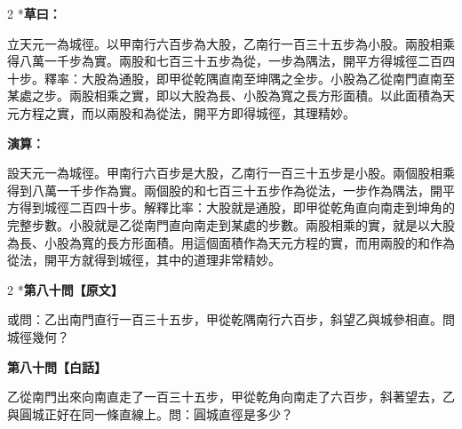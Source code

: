 \documentclass[11pt,a4paper]{article}
\begin{document}
\begin{paracol}{2}
\switchcolumn[0]*\textbf{草曰：}

\small 立天元一為城徑。以甲南行六百步為大股，乙南行一百三十五步為小股。兩股相乘得八萬一千步為實。兩股和七百三十五步為從，一步為隅法，開平方得城徑二百四十步。釋率：大股為通股，即甲從乾隅直南至坤隅之全步。小股為乙從南門直南至某處之步。兩股相乘之實，即以大股為長、小股為寬之長方形面積。以此面積為天元方程之實，而以兩股和為從法，開平方即得城徑，其理精妙。

\switchcolumn\textbf{演算：}

\small 設天元一為城徑。甲南行六百步是大股，乙南行一百三十五步是小股。兩個股相乘得到八萬一千步作為實。兩個股的和七百三十五步作為從法，一步作為隅法，開平方得到城徑二百四十步。解釋比率：大股就是通股，即甲從乾角直向南走到坤角的完整步數。小股就是乙從南門直向南走到某處的步數。兩股相乘的實，就是以大股為長、小股為寬的長方形面積。用這個面積作為天元方程的實，而用兩股的和作為從法，開平方就得到城徑，其中的道理非常精妙。
\end{paracol}

\vspace{0.1cm}
\noindent{}
\par\vspace{0.3cm}

\begin{paracol}{2}
\switchcolumn[0]*\noindent\textbf{第八十問【原文】}

\small 或問：乙出南門直行一百三十五步，甲從乾隅南行六百步，斜望乙與城參相直。問城徑幾何？

\switchcolumn\noindent\textbf{第八十問【白話】}

\small 乙從南門出來向南直走了一百三十五步，甲從乾角向南走了六百步，斜著望去，乙與圓城正好在同一條直線上。問：圓城直徑是多少？
\end{paracol}

\vspace{0.1cm}
\noindent{}
\par\vspace{0.15cm}
\end{document}
